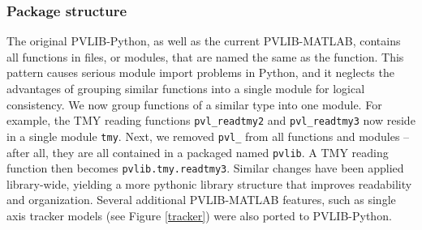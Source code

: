 \documentclass[conference]{IEEEtran}
\begin{document}
\subsubsection{Package structure} 
The original PVLIB-Python, as well as the current PVLIB-MATLAB, contains all functions in files, or modules, that are named the same as the function. 
This pattern causes serious module import problems in Python, and it neglects the advantages of grouping similar functions into a single module for logical consistency.
We now group functions of a similar type into one module. 
For example, the TMY reading functions \texttt{pvl{\_}readtmy2} and \texttt{pvl{\_}readtmy3} now reside in a single module \texttt{tmy}.
Next, we removed \texttt{pvl{\_}} from all functions and modules -- after all, they are all contained in a packaged named \texttt{pvlib}. 
A TMY reading function then becomes \texttt{pvlib.tmy.readtmy3}. 
Similar changes have been applied library-wide, yielding a more pythonic library structure that improves readability and organization.
Several additional PVLIB-MATLAB features, such as single axis tracker models (see Figure \ref{tracker}) were also ported to PVLIB-Python.
\end{document}
